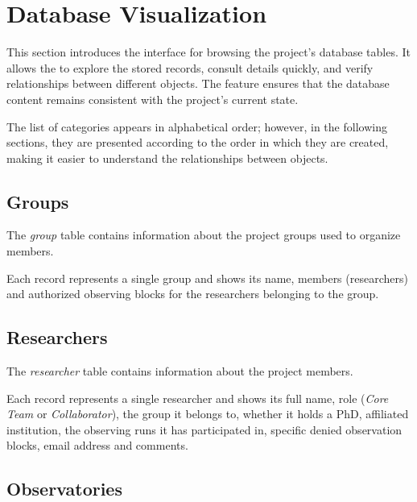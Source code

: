
\chapter{Database Visualization} \label{chap:admin-database}

This section introduces the interface for browsing the project’s database tables. It allows the \admin to explore the stored records, consult details quickly, and verify relationships between different objects. The feature ensures that the database content remains consistent with the project’s current state.


The list of categories appears in alphabetical order; however, in the following sections, they are presented according to the order in which they are created, making it easier to understand the relationships between objects.

\section{Groups}

The \textsl{group} table contains information about the project groups used to organize members. 

Each record represents a single group and shows its name, members (researchers) and authorized observing blocks for the researchers belonging to the group.


\section{Researchers}

The \textsl{researcher} table contains information about the project members. 

Each record represents a single researcher and shows its full name, role (\textsl{Core Team} or \textsl{Collaborator}), the group it belongs to, whether it holds a PhD, affiliated institution, the observing runs it has participated in, specific denied observation blocks, email address and comments.


\section{Observatories}


